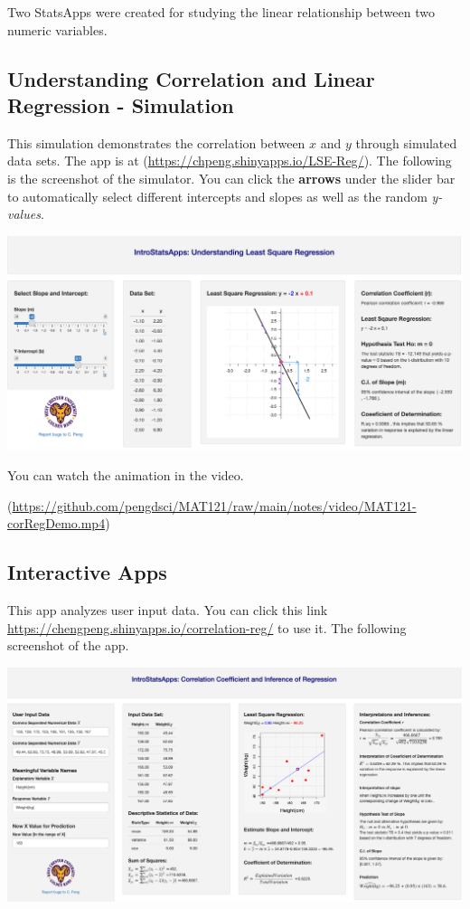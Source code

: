 \documentclass[
]{book}
\begin{document}
Two StatsApps were created for studying the linear relationship between two numeric variables.

\hypertarget{understanding-correlation-and-linear-regression---simulation}{%
\subsection{Understanding Correlation and Linear Regression - Simulation}\label{understanding-correlation-and-linear-regression---simulation}}

This simulation demonstrates the correlation between \(x\) and \(y\) through simulated data sets. The app is at (\url{https://chpeng.shinyapps.io/LSE-Reg/}). The following is the screenshot of the simulator. You can click the \textbf{arrows} under the slider bar to automatically select different intercepts and slopes as well as the random \emph{y-values}.

\begin{center}\includegraphics[width=1\linewidth]{week12/corRegDemo} \end{center}

You can watch the animation in the video.

(\url{https://github.com/pengdsci/MAT121/raw/main/notes/video/MAT121-corRegDemo.mp4})

\hypertarget{interactive-apps}{%
\subsection{Interactive Apps}\label{interactive-apps}}

This app analyzes user input data. You can click this link \url{https://chengpeng.shinyapps.io/correlation-reg/} to use it. The following screenshot of the app.

\begin{center}\includegraphics[width=1\linewidth]{week12/corRegAnalyzer} \end{center}
\end{document}
